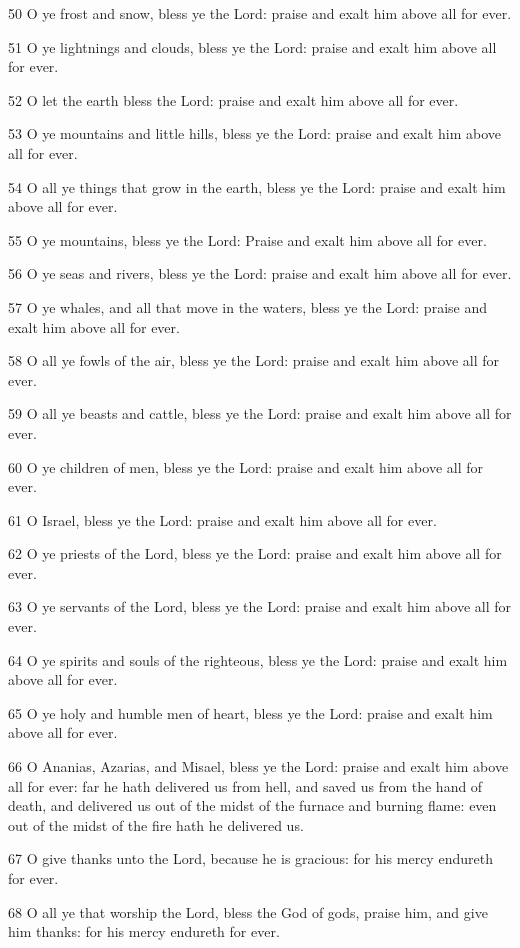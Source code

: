 \par 50 O ye frost and snow, bless ye the Lord: praise and exalt him above all for ever.
\par 51 O ye lightnings and clouds, bless ye the Lord: praise and exalt him above all for ever.
\par 52 O let the earth bless the Lord: praise and exalt him above all for ever.
\par 53 O ye mountains and little hills, bless ye the Lord: praise and exalt him above all for ever.
\par 54 O all ye things that grow in the earth, bless ye the Lord: praise and exalt him above all for ever.
\par 55 O ye mountains, bless ye the Lord: Praise and exalt him above all for ever.
\par 56 O ye seas and rivers, bless ye the Lord: praise and exalt him above all for ever.
\par 57 O ye whales, and all that move in the waters, bless ye the Lord: praise and exalt him above all for ever.
\par 58 O all ye fowls of the air, bless ye the Lord: praise and exalt him above all for ever.
\par 59 O all ye beasts and cattle, bless ye the Lord: praise and exalt him above all for ever.
\par 60 O ye children of men, bless ye the Lord: praise and exalt him above all for ever.
\par 61 O Israel, bless ye the Lord: praise and exalt him above all for ever.
\par 62 O ye priests of the Lord, bless ye the Lord: praise and exalt him above all for ever.
\par 63 O ye servants of the Lord, bless ye the Lord: praise and exalt him above all for ever.
\par 64 O ye spirits and souls of the righteous, bless ye the Lord: praise and exalt him above all for ever.
\par 65 O ye holy and humble men of heart, bless ye the Lord: praise and exalt him above all for ever.
\par 66 O Ananias, Azarias, and Misael, bless ye the Lord: praise and exalt him above all for ever: far he hath delivered us from hell, and saved us from the hand of death, and delivered us out of the midst of the furnace and burning flame: even out of the midst of the fire hath he delivered us.
\par 67 O give thanks unto the Lord, because he is gracious: for his mercy endureth for ever.
\par 68 O all ye that worship the Lord, bless the God of gods, praise him, and give him thanks: for his mercy endureth for ever.

